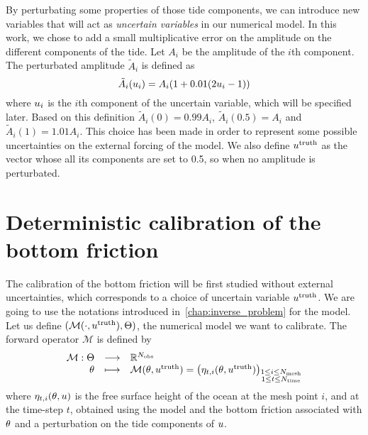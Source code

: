 \documentclass[../../Main_ManuscritThese.tex]{subfiles}
\begin{document}
By perturbating some properties of those tide components, we can
introduce new variables that will act as \emph{uncertain variables} in
our numerical model.  In this work, we chose to add a small
multiplicative error on the amplitude on the different components of
the tide. Let $A_i$ be the amplitude of the $i$th component. The
perturbated amplitude $\tilde{A}_i$ is defined as
\begin{equation}
  \label{eq:tide_error}
  \tilde{A}_i(u_i) = A_i (1 + 0.01(2u_i - 1))
\end{equation}
where $u_i$ is the $i$th component of the uncertain variable, which
will be specified later. Based on this definition
$\tilde{A}_i(0) = 0.99A_i$, $\tilde{A}_i(0.5) = A_i$ and
$\tilde{A}_i(1) = 1.01A_i$. This choice has been made in order to
represent some possible uncertainties on the external forcing of the
model. We also define $u^{\mathrm{truth}}$ as the vector whose all
its components are set to \num{0.5}, so when no amplitude is
perturbated.

\section{Deterministic calibration of the bottom friction}
\label{sec:deterministic_calibration_bott}
The calibration of the bottom friction will be first studied without
external uncertainties, which corresponds to a choice of uncertain
variable $u^{\mathrm{truth}}$.
We are going to use the notations introduced
in~\cref{chap:inverse_problem} for the model. Let us define
$(\mathcal{M}(\cdot,u^{\mathrm{truth}}),\Theta)$, the numerical
model we want to calibrate. The forward operator $\mathcal{M}$ is
defined by
\begin{equation}
  \begin{array}{rcl}
    \mathcal{M}: \Theta  &\longrightarrow& \mathbb{R}^{N_{\mathrm{obs}}} \\
    \theta & \longmapsto & \mathcal{M}(\theta, u^{\mathrm{truth}}) = \left(\eta_{t,i}(\theta, u^{\mathrm{truth}})\right)_{\substack{1 \leq i \leq N_{\mathrm{mesh}} \\ 1 \leq t \leq N_{\mathrm{time}}}} \\ 
  \end{array}
\end{equation}
where $\eta_{t,i}(\theta,u)$ is the free surface height of the ocean at
the mesh point $i$, and at the time-step $t$, obtained using the model
and the bottom friction associated with $\theta$ and a perturbation on
the tide components of $u$.
\end{document}
